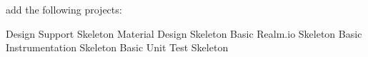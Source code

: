 add the following projects:

Design Support Skeleton
Material Design Skeleton
Basic Realm.io Skeleton
Basic Instrumentation Skeleton
Basic Unit Test Skeleton
 
